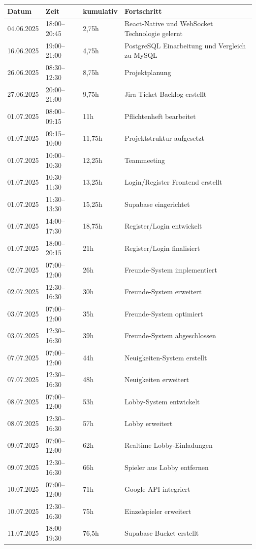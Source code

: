 \begin{longtable}{p{2.8cm} | p{2.5cm} | p{2.5cm} | p{7cm}}
Datum & Zeit & kumulativ & Fortschritt \\
\hline
04.06.2025 & 18:00–20:45 & 2,75h & React-Native und WebSocket Technologie gelernt \\
16.06.2025 & 19:00–21:00 & 4,75h & PostgreSQL Einarbeitung und Vergleich zu MySQL \\
26.06.2025 & 08:30–12:30 & 8,75h & Projektplanung \\
27.06.2025 & 20:00–21:00 & 9,75h & Jira Ticket Backlog erstellt \\

01.07.2025 & 08:00–09:15 & 11h & Pflichtenheft bearbeitet \\
01.07.2025 & 09:15–10:00 & 11,75h & Projektstruktur aufgesetzt \\
01.07.2025 & 10:00–10:30 & 12,25h & Teammeeting \\
01.07.2025 & 10:30–11:30 & 13,25h & Login/Register Frontend erstellt \\
01.07.2025 & 11:30–13:30 & 15,25h & Supabase eingerichtet \\
01.07.2025 & 14:00–17:30 & 18,75h & Register/Login entwickelt \\
01.07.2025 & 18:00–20:15 & 21h & Register/Login finalisiert \\

02.07.2025 & 07:00–12:00 & 26h & Freunde-System implementiert \\
02.07.2025 & 12:30–16:30 & 30h & Freunde-System erweitert \\
03.07.2025 & 07:00–12:00 & 35h & Freunde-System optimiert \\
03.07.2025 & 12:30–16:30 & 39h & Freunde-System abgeschlossen \\

07.07.2025 & 07:00–12:00 & 44h & Neuigkeiten-System erstellt \\
07.07.2025 & 12:30–16:30 & 48h & Neuigkeiten erweitert \\
08.07.2025 & 07:00–12:00 & 53h & Lobby-System entwickelt \\
08.07.2025 & 12:30–16:30 & 57h & Lobby erweitert \\
09.07.2025 & 07:00–12:00 & 62h & Realtime Lobby-Einladungen \\
09.07.2025 & 12:30–16:30 & 66h & Spieler aus Lobby entfernen \\
10.07.2025 & 07:00–12:00 & 71h & Google API integriert \\
10.07.2025 & 12:30–16:30 & 75h & Einzelspieler erweitert \\
11.07.2025 & 18:00–19:30 & 76,5h & Supabase Bucket erstellt \\


\end{longtable}
